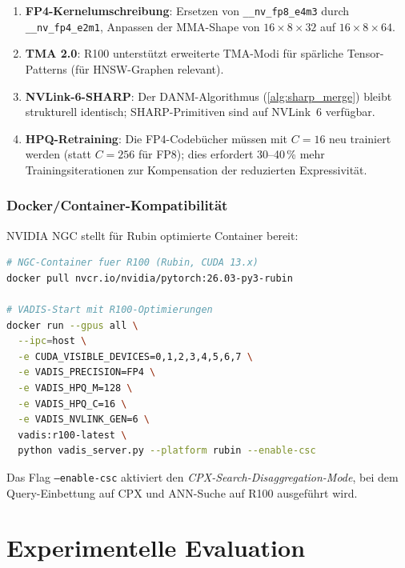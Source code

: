 ﻿\documentclass[12pt,a4paper]{article}
\begin{document}
\begin{enumerate}[leftmargin=1.4em, itemsep=2pt]
  \item \textbf{FP4-Kernelumschreibung}: Ersetzen von
        \texttt{\_\_nv\_fp8\_e4m3} durch \texttt{\_\_nv\_fp4\_e2m1},
        Anpassen der MMA-Shape von $16\times8\times32$ auf
        $16\times8\times64$.
  \item \textbf{TMA 2.0}: R100 unterstützt erweiterte TMA-Modi
        für spärliche Tensor-Patterns (für HNSW-Graphen relevant).
  \item \textbf{NVLink-6-SHARP}: Der DANM-Algorithmus
        (\cref{alg:sharp_merge}) bleibt strukturell identisch;
        SHARP-Primitiven sind auf NVLink~6 verfügbar.
  \item \textbf{HPQ-Retraining}: Die FP4-Codebücher müssen
        mit $C=16$ neu trainiert werden (statt $C=256$ für FP8);
        dies erfordert 30--40\,\% mehr Trainingsiterati\-onen
        zur Kompensation der reduzierten Expressivität.
\end{enumerate}

\subsubsection{Docker/Container-Kompatibilität}

NVIDIA NGC stellt für Rubin optimierte Container bereit:

\begin{lstlisting}[language=bash, caption={VADIS-Container für R100/Rubin (NGC)}]
# NGC-Container fuer R100 (Rubin, CUDA 13.x)
docker pull nvcr.io/nvidia/pytorch:26.03-py3-rubin

# VADIS-Start mit R100-Optimierungen
docker run --gpus all \
  --ipc=host \
  -e CUDA_VISIBLE_DEVICES=0,1,2,3,4,5,6,7 \
  -e VADIS_PRECISION=FP4 \
  -e VADIS_HPQ_M=128 \
  -e VADIS_HPQ_C=16 \
  -e VADIS_NVLINK_GEN=6 \
  vadis:r100-latest \
  python vadis_server.py --platform rubin --enable-csc
\end{lstlisting}

\noindent Das Flag \texttt{--enable-csc} aktiviert den
\emph{CPX-Search-Disaggregation-Mode}, bei dem
Query-Einbettung auf CPX und ANN-Suche auf R100 ausgeführt wird.

\section{Experimentelle Evaluation}
\label{sec:experimente}
\end{document}
